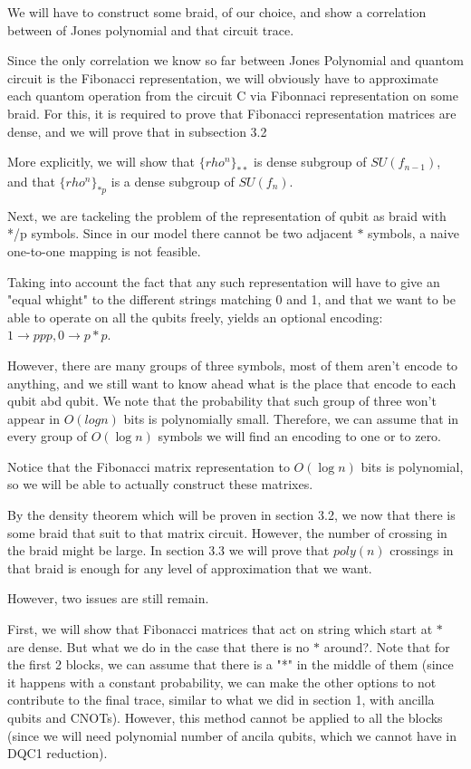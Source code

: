 \documentclass{article}
\begin{document}
We will have to construct some braid, of our choice, and show a correlation between of Jones polynomial and that circuit trace.

Since the only correlation we know so far between Jones Polynomial and quantom circuit is the Fibonacci representation, we will obviously have to approximate each quantom operation from the circuit C via Fibonnaci representation on some braid. For this, it is required to prove that Fibonacci representation matrices are dense, and we will prove that in subsection 3.2

More explicitly, we will show that $\{rho^{n}\}_{**}$ is dense subgroup of $SU(f_{n-1})$, and that $\{rho^{n}\}_{*p}$ is a dense subgroup of $SU(f_{n})$.

Next, we are tackeling the problem of the representation of qubit as braid with */p symbols. Since in our model there cannot be two adjacent $*$ symbols, a naive one-to-one mapping is not feasible.

Taking into account the fact that any such representation will have to give an "equal whight" to the different strings matching 0 and 1, and that we want to be able to operate on all the qubits freely, yields an optional encoding: $1 \rightarrow ppp, 0 \rightarrow p*p$.

However, there are many groups of three symbols, most of them aren't encode to anything, and we still want to know ahead what is the place that encode to each qubit abd qubit. We note that the probability that such group of three won't appear in $O(logn)$ bits is polynomially small. Therefore, we can assume that in every group of $O(\log{n})$ symbols we will find an encoding to one or to zero.

Notice that the Fibonacci matrix representation to $O(\log{n})$ bits is polynomial, so we will be able to actually construct these matrixes.

By the density theorem which will be proven in section 3.2, we now that there is some braid that suit to that matrix circuit. However, the number of crossing in the braid might be large. In section 3.3 we will prove that $poly(n)$ crossings in that braid is enough for any level of approximation that we want.

However, two issues are still remain.

First, we will show that Fibonacci matrices that act on string which start at $*$ are dense. But what we do in the case that there is no $*$ around?. Note that for the first 2 blocks, we can assume that there is a "*" in the middle of them (since it happens with a constant probability, we can make the other options to not contribute to the final trace, similar to what we did in section 1, with ancilla qubits and CNOTs). However, this method cannot be applied to all the blocks (since we will need polynomial number of ancila qubits, which we cannot have in DQC1 reduction).
\end{document}
